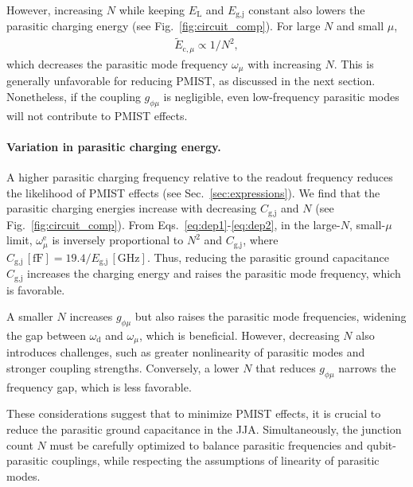 \documentclass[%
reprint,
superscriptaddress,
 amsmath,amssymb,
 aps,
 prx,
longbibliography,
floatfix,
]{revtex4-2}
\begin{document}
However, increasing \( N \) while keeping \( E_\textrm{L} \) and \( E_\textrm{g,j} \) constant also lowers the parasitic charging energy (see Fig.~\ref{fig:circuit_comp}). For large \( N \) and small \( \mu \), 
\begin{align}
 \tilde{E}_{\textrm{c},\mu} \propto 1/N^2,\label{eq:dep2}
\end{align}
which decreases the parasitic mode frequency \( \omega_\mu \) with increasing \( N \). This is generally unfavorable for reducing PMIST, as discussed in the next section. Nonetheless, if the coupling \( g_{\phi\mu} \) is negligible, even low-frequency parasitic modes will not contribute to PMIST effects.
\paragraph{Variation in parasitic charging energy.}\label{par-freq} 
A higher parasitic charging frequency relative to the readout frequency reduces the likelihood of PMIST effects (see Sec.~\ref{sec:expressions}). We find that the parasitic charging energies increase with decreasing \( C_\textrm{g,j} \) and \( N \) (see Fig.~\ref{fig:circuit_comp}). From Eqs.~\ref{eq:dep1}-\ref{eq:dep2}, in the large-\( N \), small-\( \mu \) limit, \( \omega_\mu^\textrm{e} \) is inversely proportional to \( N^2 \) and \( C_\textrm{g,j} \), where \( C_\textrm{g,j} \, [\mathrm{fF}] = 19.4 / E_\textrm{g,j} \, [\mathrm{GHz}] \). Thus, reducing the parasitic ground capacitance \( C_\textrm{g,j} \) increases the charging energy and raises the parasitic mode frequency, which is favorable. 

A smaller \( N \) increases \( g_{\phi\mu} \) but also raises the parasitic mode frequencies, widening the gap between \( \omega_\textrm{d} \) and \( \omega_\mu \), which is beneficial. However, decreasing \( N \) also introduces challenges, such as greater nonlinearity of parasitic modes and stronger coupling strengths. Conversely, a lower \( N \) that reduces \( g_{\phi\mu} \) narrows the frequency gap, which is less favorable. 

These considerations suggest that to minimize PMIST effects, it is crucial to reduce the parasitic ground capacitance in the JJA. Simultaneously, the junction count \( N \) must be carefully optimized to balance parasitic frequencies and qubit-parasitic couplings, while respecting the assumptions of linearity of parasitic modes.
\end{document}
